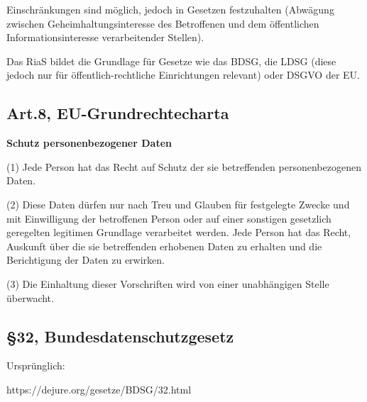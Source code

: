     Einschränkungen sind möglich, jedoch in Gesetzen festzuhalten (Abwägung zwischen Geheimhaltungsinteresse des Betroffenen und dem öffentlichen Informationsinteresse verarbeitender Stellen).
    
    Das RiaS bildet die Grundlage für Gesetze wie das BDSG, die LDSG (diese jedoch nur für öffentlich-rechtliche Einrichtungen relevant) oder DSGVO der EU.
    
  \subsection*{Art.8, EU-Grundrechtecharta}
      
      \textbf{Schutz personenbezogener Daten}
      
      (1) Jede Person hat das Recht auf Schutz der sie betreffenden personenbezogenen Daten. 
      
      (2) Diese Daten dürfen nur nach Treu und Glauben für festgelegte Zwecke und mit Einwilligung 
      der betroffenen Person oder auf einer sonstigen gesetzlich geregelten legitimen Grundlage verarbeitet werden. Jede Person hat das Recht, Auskunft über die sie betreffenden erhobenen Daten zu erhalten und die Berichtigung der Daten zu erwirken. 
      
      (3) Die Einhaltung dieser Vorschriften wird von einer unabhängigen Stelle überwacht. 
  
  \subsection*{§32, Bundesdatenschutzgesetz}
  
  Ursprünglich:
   
  https://dejure.org/gesetze/BDSG/32.html
  
